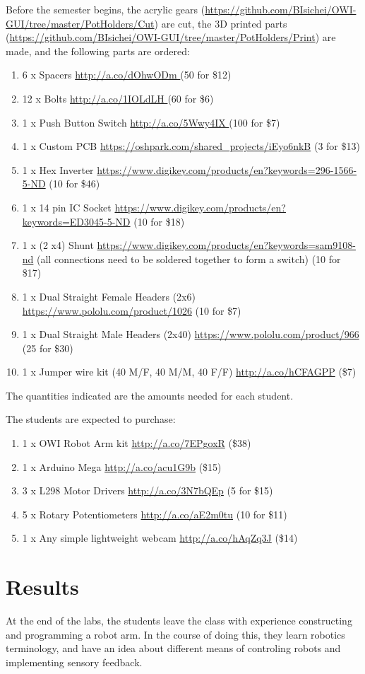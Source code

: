 Before the semester begins, the acrylic gears (\url{https://github.com/BIsichei/OWI-GUI/tree/master/PotHolders/Cut}) are cut, the 3D printed parts (\url{https://github.com/BIsichei/OWI-GUI/tree/master/PotHolders/Print}) are made, and the following parts are ordered: 
\begin{enumerate}
\item 6 x Spacers \url{http://a.co/dOhwODm } (50 for \$12)
\item 12 x Bolts \url{http://a.co/1IOLdLH }  (60 for \$6)
\item 1 x Push Button Switch \url{http://a.co/5Wwy4IX } (100 for \$7)
\item 1 x Custom PCB \url{https://oshpark.com/shared_projects/iEyo6nkB}  (3 for \$13)
\item 1 x Hex Inverter \url{https://www.digikey.com/products/en?keywords=296-1566-5-ND} (10 for \$46)
\item 1 x 14 pin IC Socket \url{https://www.digikey.com/products/en?keywords=ED3045-5-ND} (10 for \$18)
\item 1 x (2 x4) Shunt \url{https://www.digikey.com/products/en?keywords=sam9108-nd}  (all connections need to be soldered together to form a switch) (10 for \$17)
\item 1 x Dual Straight Female Headers (2x6) \url{https://www.pololu.com/product/1026} (10 for \$7)
\item 1 x Dual Straight Male Headers (2x40) \url{https://www.pololu.com/product/966} (25 for \$30)
\item 1 x Jumper wire kit (40 M/F, 40 M/M, 40 F/F) \url{http://a.co/hCFAGPP} (\$7)
\end{enumerate}
The quantities indicated are the amounts needed for each student. 

The students are expected to purchase:
\begin{enumerate}
\item 1 x OWI Robot Arm kit \url{http://a.co/7EPgoxR} (\$38)
\item 1 x Arduino Mega \url{http://a.co/acu1G9b} (\$15)
\item 3 x L298 Motor Drivers \url{http://a.co/3N7bQEp} (5 for \$15)
\item 5 x Rotary Potentiometers \url{http://a.co/aE2m0tu} (10 for \$11)
\item 1 x Any simple lightweight webcam \url{http://a.co/hAqZq3J} (\$14)
\end{enumerate}


\section{Results}

At the end of the labs, the students leave the class with experience constructing and programming a robot arm. In the course of doing this, they learn robotics terminology, and have an idea about different means of controling robots and implementing sensory feedback. 
